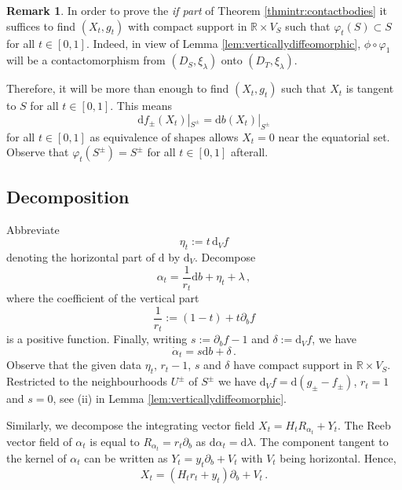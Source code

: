 \documentclass{amsart}
\theoremstyle{definition}
\newtheorem{rem}[prop]{Remark}
\newcommand{\rmd}{\mathrm d}
\newcommand{\R}{\mathbb R}
\begin{document}
\begin{rem}
\label{rem:frommosertocontactom}
In order to prove
the {\it if part} of Theorem \ref{thmintr:contactbodies}
it suffices to find $(X_t,g_t)$
with compact support in $\R\times V_S$
such that $\varphi_t(S)\subset S$
for all $t\in[0,1]$.
Indeed, in view of Lemma \ref{lem:verticallydiffeomorphic},
$\phi\circ\varphi_1$ will be a contactomorphism
from $(D_S,\xi_{\lambda})$ onto $(D_T,\xi_{\lambda})$.
\end{rem}


Therefore,
it will be more than enough to find $(X_t,g_t)$ such that
$X_t$ is tangent to $S$ for all $t\in[0,1]$.
This means
\[
\rmd f_{\pm}(X_t)|_{S^{\pm}}=\rmd b(X_t)|_{S^{\pm}}
\]
for all $t\in[0,1]$
as equivalence of shapes allows $X_t=0$
near the equatorial set.
Observe that $\varphi_t(S^{\pm})=S^{\pm}$
for all $t\in[0,1]$ afterall.




\subsection{Decomposition}
\label{subsec:decomposition}


Abbreviate
\[
\eta_t:=t\,\rmd_V\!f
\]
denoting the horizontal part of $\rmd$ by $\rmd_V\!$.
Decompose
\[
\alpha_t=\frac{1}{r_t}\rmd b+
\eta_t+\lambda
\,,
\]
where the coefficient of the vertical part
\[
\frac{1}{r_t}:=(1-t)+t\partial_bf
\]
is a positive function.
Finally,
writing $s:=\partial_bf-1$ and $\delta:=\rmd_V\!f$,
we have
\[
\dot\alpha_t=
s\rmd b+\delta
\,.
\]
Observe that the given data
$\eta_t$, $r_t-1$, $s$ and $\delta$
have compact support in $\R\times V_S$.
Restricted to the neighbourhoods $U^{\pm}\!$ of $S^{\pm}$
we have $\rmd_V\!f=\rmd(g_{\pm}-f_{\pm})$,
$r_t=1$ and $s=0$,
see (ii) in Lemma \ref{lem:verticallydiffeomorphic}.

		

Similarly,
we decompose the integrating vector field
$X_t=H_tR_{\alpha_t}+Y_t$.
The Reeb vector field of $\alpha_t$
is equal to $R_{\alpha_t}=r_t\partial_b$
as $\rmd\alpha_t=\rmd\lambda$.
The component tangent to the kernel of $\alpha_t$
can be written as $Y_t=y_t\partial_b+V_t$
with $V_t$ being horizontal.
Hence,
\[
X_t=(H_tr_t+y_t)\partial_b+V_t
\,.
\]
\end{document}
